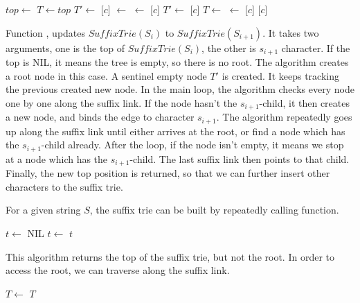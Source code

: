 \documentclass[UTF8]{article}
\begin{document}
\begin{algorithmic}
   
    \State $top \gets$ 
  \EndIf
  \State $T \gets top$
  \State $T' \gets$  
    \State {}[$c$] $\gets$ 
    \State {} $\gets$ [$c$]
    \State $T' \gets$ [$c$]
    \State $T \gets$ 
  \EndWhile
    \State {} $\gets$ [$c$]
  \EndIf
  \State \Return {}[$c$] 
\EndFunction
\end{algorithmic}

Function , updates $SuffixTrie(S_i)$ to $SuffixTrie(S_{i+1})$.
It takes two arguments, one is the top of $SuffixTrie(S_i)$, the other
is $s_{i+1}$ character. If the top is NIL, it means the tree is empty,
so there is no root. The algorithm creates a root node in this case.
A sentinel empty node $T'$ is created. It keeps tracking the previous
created new node. In the main loop, the algorithm checks every node
one by one along the suffix link. If the node hasn't the $s_{i+1}$-child,
it then creates a new node, and binds the edge to character $s_{i+1}$.
The algorithm repeatedly goes up along the suffix link until either
arrives at the root, or find a node which has the $s_{i+1}$-child already.
After the loop, if the node isn't empty, it means we stop at a node
which has the $s_{i+1}$-child.
The last suffix link then points to that child.
Finally, the new top position is returned, so that we can further
insert other characters to the suffix trie.

For a given string $S$, the suffix trie can be built by repeatedly
calling  function.

\begin{algorithmic}[1]
  \State $t \gets$ NIL
    \State $t \gets$ 
  \EndFor
  \State \Return $t$
\EndFunction
\end{algorithmic}

This algorithm returns the top of the suffix trie, but not the root.
In order to access the root, we can traverse along the suffix link.

\begin{algorithmic}[1]
    \State $T \gets$ 
  \EndWhile
  \State \Return $T$
\EndFunction
\end{algorithmic}
\end{document}
